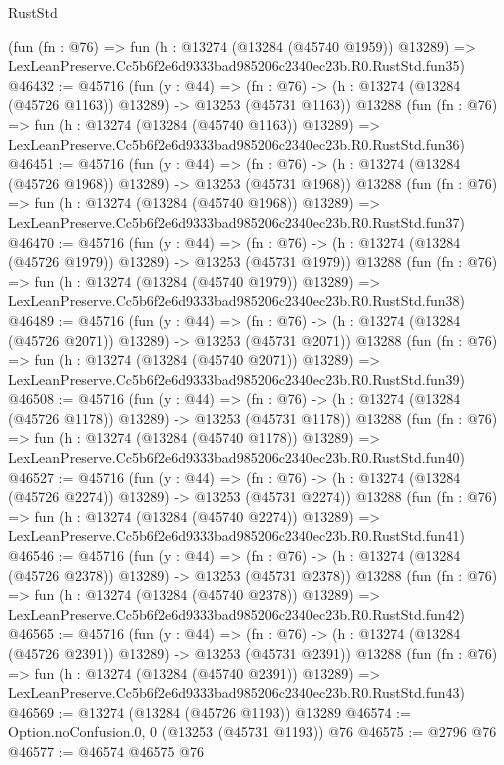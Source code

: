 \begin{lexlean}{RustStd}
\begin{coremodule}
    (fun (fn : @76) =>
    fun (h : @13274 (@13284 (@45740 @1959)) @13289) =>
    LexLeanPreserve.Cc5b6f2e6d9333bad985206c2340ec23b.R0.RustStd.fun35)
@46432 := @45716
    (fun (y : @44) =>
    (fn : @76) -> (h : @13274 (@13284 (@45726 @1163)) @13289) -> @13253 (@45731 @1163))
    @13288
    (fun (fn : @76) =>
    fun (h : @13274 (@13284 (@45740 @1163)) @13289) =>
    LexLeanPreserve.Cc5b6f2e6d9333bad985206c2340ec23b.R0.RustStd.fun36)
@46451 := @45716
    (fun (y : @44) =>
    (fn : @76) -> (h : @13274 (@13284 (@45726 @1968)) @13289) -> @13253 (@45731 @1968))
    @13288
    (fun (fn : @76) =>
    fun (h : @13274 (@13284 (@45740 @1968)) @13289) =>
    LexLeanPreserve.Cc5b6f2e6d9333bad985206c2340ec23b.R0.RustStd.fun37)
@46470 := @45716
    (fun (y : @44) =>
    (fn : @76) -> (h : @13274 (@13284 (@45726 @1979)) @13289) -> @13253 (@45731 @1979))
    @13288
    (fun (fn : @76) =>
    fun (h : @13274 (@13284 (@45740 @1979)) @13289) =>
    LexLeanPreserve.Cc5b6f2e6d9333bad985206c2340ec23b.R0.RustStd.fun38)
@46489 := @45716
    (fun (y : @44) =>
    (fn : @76) -> (h : @13274 (@13284 (@45726 @2071)) @13289) -> @13253 (@45731 @2071))
    @13288
    (fun (fn : @76) =>
    fun (h : @13274 (@13284 (@45740 @2071)) @13289) =>
    LexLeanPreserve.Cc5b6f2e6d9333bad985206c2340ec23b.R0.RustStd.fun39)
@46508 := @45716
    (fun (y : @44) =>
    (fn : @76) -> (h : @13274 (@13284 (@45726 @1178)) @13289) -> @13253 (@45731 @1178))
    @13288
    (fun (fn : @76) =>
    fun (h : @13274 (@13284 (@45740 @1178)) @13289) =>
    LexLeanPreserve.Cc5b6f2e6d9333bad985206c2340ec23b.R0.RustStd.fun40)
@46527 := @45716
    (fun (y : @44) =>
    (fn : @76) -> (h : @13274 (@13284 (@45726 @2274)) @13289) -> @13253 (@45731 @2274))
    @13288
    (fun (fn : @76) =>
    fun (h : @13274 (@13284 (@45740 @2274)) @13289) =>
    LexLeanPreserve.Cc5b6f2e6d9333bad985206c2340ec23b.R0.RustStd.fun41)
@46546 := @45716
    (fun (y : @44) =>
    (fn : @76) -> (h : @13274 (@13284 (@45726 @2378)) @13289) -> @13253 (@45731 @2378))
    @13288
    (fun (fn : @76) =>
    fun (h : @13274 (@13284 (@45740 @2378)) @13289) =>
    LexLeanPreserve.Cc5b6f2e6d9333bad985206c2340ec23b.R0.RustStd.fun42)
@46565 := @45716
    (fun (y : @44) =>
    (fn : @76) -> (h : @13274 (@13284 (@45726 @2391)) @13289) -> @13253 (@45731 @2391))
    @13288
    (fun (fn : @76) =>
    fun (h : @13274 (@13284 (@45740 @2391)) @13289) =>
    LexLeanPreserve.Cc5b6f2e6d9333bad985206c2340ec23b.R0.RustStd.fun43)
@46569 := @13274 (@13284 (@45726 @1193)) @13289
@46574 := Option.noConfusion.{0, 0} (@13253 (@45731 @1193)) @76
@46575 := @2796 @76
@46577 := @46574 @46575 @76

\end{coremodule}
\end{lexlean}
